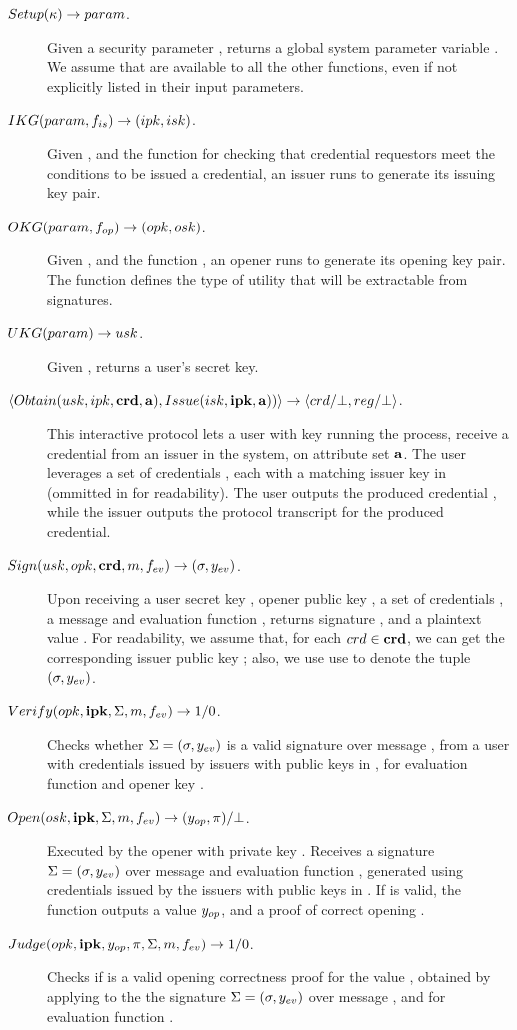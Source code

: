 \begin{description}
\item[$Setup(\kappa) \rightarrow param$.] Given a security parameter \secpar,
  returns a global system parameter variable \parm. We assume that \parm are
  available to all the other functions, even if not explicitly listed in their
  input parameters.
\item[$IKG(param,f_{is}) \rightarrow (ipk,isk)$.] Given \parm, and the
  function \fissue for checking that credential requestors meet the conditions
  to be issued a credential, an issuer runs \IKeyGen to generate its issuing key
  pair. 
\item[$OKG(param,f_{op}) \rightarrow (opk,osk)$.] Given \parm, and the
  function \finsp, an opener runs \OKeyGen to generate its opening key pair.
  The function \finsp defines the type of utility that will be extractable from
  signatures.
\item[$UKG(param) \rightarrow usk$.] Given \parm, returns a user's secret
  key.
\item[$\langle
  Obtain(usk,ipk,\mathbf{crd},\mathbf{a}),
  Issue(isk,\mathbf{ipk},\mathbf{a}))
  \rangle \rightarrow \langle crd/\bot,reg/\bot \rangle$.] %
  This interactive protocol lets a user with key \usk running the \Obtain
  process, receive a credential \cred from an issuer in the system, on attribute
  set $\mathbf{a}$. The user leverages a set of credentials \scred, each with a
  matching issuer key in \sipk (ommitted in \Obtain for readability). The user
  outputs the produced credential \cred, while the issuer outputs the protocol
  transcript \utrans for the produced credential.
\item[$Sign(usk,opk,\mathbf{crd},m,f_{ev}) \rightarrow (\sigma,y_{ev})$.] %
  Upon receiving a user secret key \usk, opener public key \opk, a set of
  credentials \scred, a message \msg and evaluation function \feval, returns
  signature \sig, and a plaintext value \yeval. For readability, we assume
  that, for each $crd \in \mathbf{crd}$, we can get the corresponding issuer public
  key \ipk; also, we use use \Sig to denote the tuple $(\sigma,y_{ev})$.
\item[$Verify(opk, \mathbf{ipk},\Sigma,m,f_{ev}) \rightarrow 1/0$.]
  Checks whether $\Sigma = (\sigma,y_{ev})$ is a valid signature
  over message \msg, from a user with credentials issued by issuers with public
  keys in \sipk, for evaluation function \feval and opener key \opk.
\item[$Open(osk,\mathbf{ipk},\Sigma,m,f_{ev}) \rightarrow
  (y_{op},\pi)/\bot$.]
  Executed by the opener with private key \osk. Receives a signature $\Sigma=
  (\sigma,y_{ev})$ over message \msg and evaluation function \feval,
  generated using credentials issued by the issuers with public keys in \sipk.
  If \Sig is valid, the function outputs a value $y_{op}$, and a proof of
  correct opening \iproof.
\item[$Judge(opk,\mathbf{ipk},y_{op},\pi,\Sigma,m,f_{ev}) \rightarrow 1/0$.] %
  Checks if \iproof is a valid opening correctness proof for the value \yinsp,
  obtained by applying \Open to the the signature $\Sigma = (\sigma,y_{ev})$
  over message \msg, and for evaluation function \feval. 
\end{description}

